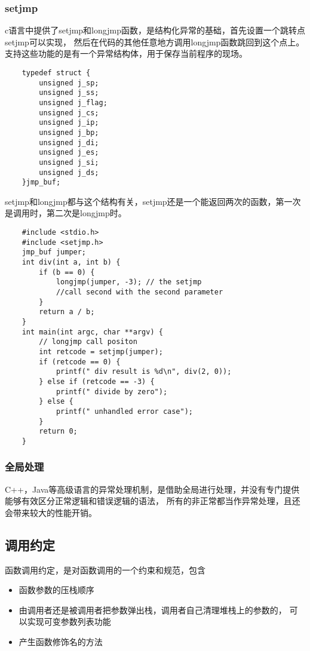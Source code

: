 \subsubsection{setjmp}
c语言中提供了setjmp和longjmp函数，是结构化异常的基础，首先设置一个跳转点setjmp可以实现，
然后在代码的其他任意地方调用longjmp函数跳回到这个点上。
\newline
支持这些功能的是有一个异常结构体，用于保存当前程序的现场。
\begin{lstlisting}
    typedef struct {
        unsigned j_sp;
        unsigned j_ss;
        unsigned j_flag;
        unsigned j_cs;
        unsigned j_ip;
        unsigned j_bp;
        unsigned j_di;
        unsigned j_es;
        unsigned j_si;
        unsigned j_ds;
    }jmp_buf;
\end{lstlisting}
setjmp和longjmp都与这个结构有关，setjmp还是一个能返回两次的函数，第一次是调用时，第二次是longjmp时。
\begin{lstlisting}
    #include <stdio.h>
    #include <setjmp.h>
    jmp_buf jumper;
    int div(int a, int b) {
        if (b == 0) {
            longjmp(jumper, -3); // the setjmp 
            //call second with the second parameter
        }
        return a / b;
    }
    int main(int argc, char **argv) {
        // longjmp call positon 
        int retcode = setjmp(jumper); 
        if (retcode == 0) {
            printf(" div result is %d\n", div(2, 0));
        } else if (retcode == -3) {
            printf(" divide by zero");
        } else {
            printf(" unhandled error case");
        }
        return 0;
    }
\end{lstlisting}

\subsubsection{全局处理}
C++，Java等高级语言的异常处理机制，是借助全局进行处理，并没有专门提供能够有效区分正常逻辑和错误逻辑的语法，
所有的非正常都当作异常处理，且还会带来较大的性能开销。

\subsection{调用约定}
函数调用约定，是对函数调用的一个约束和规范，包含
\begin{itemize}
    \item {函数参数的压栈顺序}
    \item {由调用者还是被调用者把参数弹出栈，调用者自己清理堆栈上的参数的，
    可以实现可变参数列表功能}
    \item {产生函数修饰名的方法}
\end{itemize}

